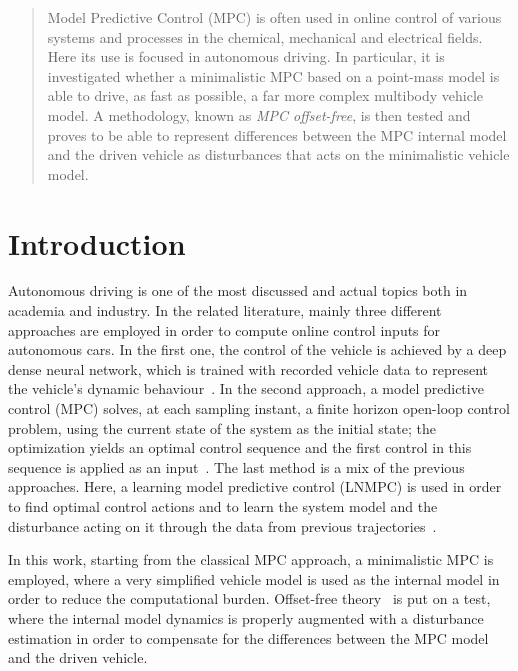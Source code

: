 \documentclass[conference]{IEEEtran} %
\begin{document}

\begin{abstract}
	Model Predictive Control (MPC) is often used in online control of various systems and processes in the chemical, mechanical and electrical fields.
	Here its use is focused in autonomous driving.
	In particular, it is investigated whether a minimalistic MPC based on a point-mass model is able to drive, as fast as possible, a far more complex multibody vehicle model.
	A methodology, known as \emph{MPC offset-free}, is then tested and proves to be able to represent differences between the MPC internal model and the driven vehicle as disturbances that acts on the minimalistic vehicle model.
\end{abstract}

\IEEEpeerreviewmaketitle

\section{Introduction}
Autonomous driving is one of the most discussed and actual topics both in academia and industry.
In the related literature, mainly three different approaches are employed in order to compute online control inputs for autonomous cars.
In the first one, the control of the vehicle is achieved by a deep dense neural network, which is trained with recorded vehicle data to represent the vehicle's dynamic behaviour~\cite{Hermansdorfer2020, Zhu2018, Navarro2018}. In the second approach, a model predictive control (MPC) solves, at each sampling instant, a finite horizon open-loop control problem, using the current state of the system as the initial state; the optimization yields an optimal control sequence and the first control in this sequence is applied as an input~\cite{Liniger2015, Novi2019, Verschueren2014}. The last method is a mix of the previous approaches. Here, a learning model predictive control (LNMPC) is used in order to find optimal control actions and
to learn the system model and the disturbance acting on it through the data from previous trajectories~\cite{Rosolia2016, Brunner2017, Limon2017}.

In this work, starting from the classical MPC approach, a minimalistic MPC is employed, where a very simplified vehicle model is used as the internal model in order to reduce the computational burden.
Offset-free theory~\cite{Pannocchia2015} is put on a test, where the internal model dynamics is properly augmented with a disturbance estimation in order to compensate for the differences between the MPC model and the driven vehicle.
\end{document}
